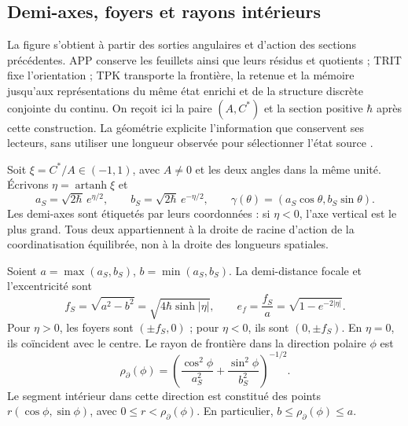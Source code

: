 
\subsection{Demi-axes, foyers et rayons intérieurs}
\label{sec:ii-elipse-geometria}

La figure s’obtient à partir des sorties angulaires et d’action des sections
précédentes. APP conserve les feuillets ainsi que leurs résidus et quotients ; TRIT fixe
l’orientation ; TPK transporte la frontière, la retenue et la mémoire jusqu’aux
représentations du même état enrichi et de la structure discrète
conjointe du continu. On reçoit ici la paire \((A,C^*)\) et la section
positive \(\hbar\) après cette construction. La géométrie explicite
l’information que conservent ses lecteurs, sans utiliser une longueur observée
pour sélectionner l’état source \cite{elipse,hmtedicionintegral}.

Soit \(\xi=C^*/A\in(-1,1)\), avec \(A\ne0\) et les deux angles dans la
même unité. Écrivons \(\eta=\operatorname{artanh}\xi\) et
\[
 a_S=\sqrt{2\hbar}\,e^{\eta/2},\qquad
 b_S=\sqrt{2\hbar}\,e^{-\eta/2},\qquad
 \gamma(\theta)=(a_S\cos\theta,b_S\sin\theta).
\]
Les demi-axes sont étiquetés par leurs coordonnées : si \(\eta<0\),
l’axe vertical est le plus grand. Tous deux appartiennent à la droite de racine
d’action de la coordinatisation équilibrée, non à la droite des longueurs spatiales.

\begin{proposition}
\label{prop:ii-elipse-focos}
Soient \(a=\max(a_S,b_S)\), \(b=\min(a_S,b_S)\). La demi-distance
focale et l'excentricité sont
\begin{equation}
 f_S=\sqrt{a^2-b^2}
 =\sqrt{4\hbar\sinh|\eta|},\qquad
 e_f=\frac{f_S}{a}=\sqrt{1-e^{-2|\eta|}}.
 \label{eq:ii-elipse-focal}
\end{equation}
Pour \(\eta>0\), les foyers sont \((\pm f_S,0)\) ; pour
\(\eta<0\), ils sont \((0,\pm f_S)\). En \(\eta=0\), ils coïncident avec
le centre. Le rayon de frontière dans la direction polaire \(\phi\) est
\begin{equation}
 \rho_{\partial}(\phi)
 =\left(\frac{\cos^2\phi}{a_S^2}
        +\frac{\sin^2\phi}{b_S^2}\right)^{-1/2}.
 \label{eq:ii-elipse-radio-polar}
\end{equation}
Le segment intérieur dans cette direction est constitué des points
\(r(\cos\phi,\sin\phi)\), avec \(0\le r<\rho_{\partial}(\phi)\).
En particulier, \(b\le\rho_{\partial}(\phi)\le a\).
\end{proposition}

